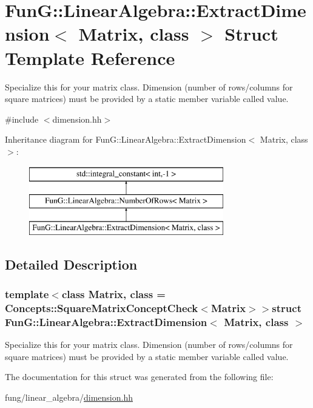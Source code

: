 \hypertarget{structFunG_1_1LinearAlgebra_1_1ExtractDimension}{\section{\-Fun\-G\-:\-:\-Linear\-Algebra\-:\-:\-Extract\-Dimension$<$ \-Matrix, class $>$ \-Struct \-Template \-Reference}
\label{structFunG_1_1LinearAlgebra_1_1ExtractDimension}
}


\-Specialize this for your matrix class. \-Dimension (number of rows/columns for square matrices) must be provided by a static member variable called value.  




{\ttfamily \#include $<$dimension.\-hh$>$}

\-Inheritance diagram for \-Fun\-G\-:\-:\-Linear\-Algebra\-:\-:\-Extract\-Dimension$<$ \-Matrix, class $>$\-:\begin{figure}[H]
\begin{center}
\leavevmode
\includegraphics[height=3.000000cm]{structFunG_1_1LinearAlgebra_1_1ExtractDimension}
\end{center}
\end{figure}


\subsection{\-Detailed \-Description}
\subsubsection*{template$<$class Matrix, class = \-Concepts\-::\-Square\-Matrix\-Concept\-Check$<$\-Matrix$>$$>$struct Fun\-G\-::\-Linear\-Algebra\-::\-Extract\-Dimension$<$ Matrix, class $>$}

\-Specialize this for your matrix class. \-Dimension (number of rows/columns for square matrices) must be provided by a static member variable called value. 

\-The documentation for this struct was generated from the following file\-:\begin{DoxyCompactItemize}
\item 
fung/linear\-\_\-algebra/\hyperlink{dimension_8hh}{dimension.\-hh}\end{DoxyCompactItemize}
